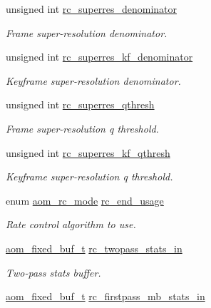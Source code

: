 \begin{DoxyCompactItemize}
unsigned int \hyperlink{structaom__codec__enc__cfg_a9217f81f33c62161df9d94e42f2b77c6}{rc\+\_\+superres\+\_\+denominator}
\begin{DoxyCompactList}\small\item\em Frame super-\/resolution denominator. \end{DoxyCompactList}\item 
unsigned int \hyperlink{structaom__codec__enc__cfg_a4b5ed538fedccae4805fec4a58187fa7}{rc\+\_\+superres\+\_\+kf\+\_\+denominator}
\begin{DoxyCompactList}\small\item\em Keyframe super-\/resolution denominator. \end{DoxyCompactList}\item 
unsigned int \hyperlink{structaom__codec__enc__cfg_a64d3517b2cef17cd57ec3f659ad0f2ab}{rc\+\_\+superres\+\_\+qthresh}
\begin{DoxyCompactList}\small\item\em Frame super-\/resolution q threshold. \end{DoxyCompactList}\item 
unsigned int \hyperlink{structaom__codec__enc__cfg_adf982eaa83e7bbdeb40f56bfd307cc98}{rc\+\_\+superres\+\_\+kf\+\_\+qthresh}
\begin{DoxyCompactList}\small\item\em Keyframe super-\/resolution q threshold. \end{DoxyCompactList}\item 
enum \hyperlink{group__encoder_ga7c084d3ecef569aad166ce70b0e8a957}{aom\+\_\+rc\+\_\+mode} \hyperlink{structaom__codec__enc__cfg_a3fd74d888658039d09bc4eacf163a495}{rc\+\_\+end\+\_\+usage}
\begin{DoxyCompactList}\small\item\em Rate control algorithm to use. \end{DoxyCompactList}\item 
\hyperlink{group__encoder_ga85cca9fad6bc25c667f013a39c607174}{aom\+\_\+fixed\+\_\+buf\+\_\+t} \hyperlink{structaom__codec__enc__cfg_ad5c6f5c96ec54cabc71edb01045a1f04}{rc\+\_\+twopass\+\_\+stats\+\_\+in}
\begin{DoxyCompactList}\small\item\em Two-\/pass stats buffer. \end{DoxyCompactList}\item 
\hyperlink{group__encoder_ga85cca9fad6bc25c667f013a39c607174}{aom\+\_\+fixed\+\_\+buf\+\_\+t} \hyperlink{structaom__codec__enc__cfg_a3ccdeecb9ed287076f413f088792a4d0}{rc\+\_\+firstpass\+\_\+mb\+\_\+stats\+\_\+in}

\end{DoxyCompactItemize}
